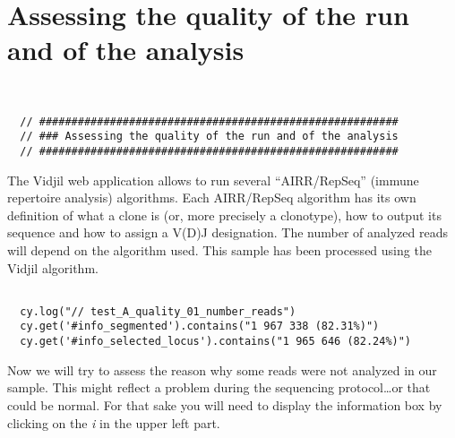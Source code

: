 
\section{Assessing the quality of the run and of the analysis}
\begin{verbatim}


  // ########################################################
  // ### Assessing the quality of the run and of the analysis
  // ########################################################

\end{verbatim}

The Vidjil web application allows to run several ``AIRR/RepSeq'' (immune repertoire analysis) algorithms.
Each AIRR/RepSeq algorithm has its own definition of what a clone is (or, more precisely
a clonotype), how to output its sequence and how to assign a V(D)J designation.
The number of analyzed reads will depend on the algorithm used.
This sample has been processed using the Vidjil algorithm.


\begin{verbatim}

  cy.log("// test_A_quality_01_number_reads")
  cy.get('#info_segmented').contains("1 967 338 (82.31%)")
  cy.get('#info_selected_locus').contains("1 965 646 (82.24%)")

\end{verbatim}

Now we will try to assess the reason why some reads were not analyzed in our
sample.
This might reflect a problem during the sequencing protocol\dots or that could
be normal.
For that sake you will need to display the information box by clicking on the
\textit{i} in the upper left part.

